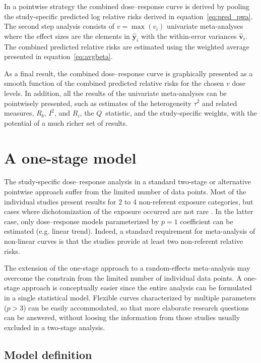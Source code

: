 \documentclass[11pt,a4paper,twoside,openany]{book}\usepackage{knitr}
\begin{document}
{In a pointwise strategy the combined dose--response curve is derived by pooling the study-specific predicted log relative risks derived in equation~\ref{eq:pred_pwa}. The second step analysis consists of $v = \max(v_i)$ univariate meta-analyses where the effect sizes are the elements in $\hat {\boldsymbol y}_i$ with the within-error variances $\hat{\boldsymbol{v}}_i$.
The combined predicted relative risks are estimated using the weighted average presented in equation~\ref{eq:avgbeta}.

As a final result, the combined dose--response curve is graphically presented as a smooth function of the combined predicted relative risks for the chosen $v$ dose levels. In addition, all the results of the univariate meta-analyses can be pointwisely presented, such as estimates of the heterogeneity $\tau^2$ and related measures, $R_b$, $I^2$, and $R_i$, the $Q$~statistic, and the study-specific weights, with the potential of a much richer set of results.


\section{A one-stage model}

The study-specific dose--response analysis in a standard two-stage or alternative pointwise approach suffer from the limited number of data points. Most of the individual studies present results for 2 to 4 non-referent exposure categories, but cases where dichotomization of the exposure occurred are not rare \citep{turner2010categorisation}. In the latter case, only dose--response models parameterized by $p = 1$ coefficient can be estimated (e.g. linear trend). Indeed, a standard requirement for meta-analysis of non-linear curves is that the studies provide at least two non-referent relative risks.

The extension of the one-stage approach to a random-effects meta-analysis may overcome the constrain from the limited number of individual data points. A one-stage approach is conceptually easier since the entire analysis can be formulated in a single statistical model. Flexible curves characterized by multiple parameters ($p > 3$) can be easily accommodated, so that more elaborate research questions can be answered, without loosing the information from those studies usually excluded in a two-stage analysis.

\subsection{Model definition}

}
\end{document}
